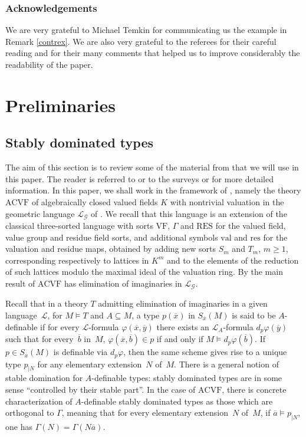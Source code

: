 \documentclass[JEP,XML,SOM,Unicode,ThmDefs,NoEqCountersInSection,published]{cedram}
\newcommand{\val}{\mathrm{val}}
\newcommand{\acvf}{\mathrm{ACVF}}
\newcommand{\RES}{\mathrm{RES}}
\newcommand{\res}{\mathrm{res}}
\newcommand{\VF}{\mathrm{VF}}
\theoremstyle{plain}
\theoremstyle{definition}
\begin{document}
\subsubsection*{Acknowledgements}
We are very grateful to Michael Temkin for communicating us the example in Remark \ref{contrex}.
We are also very grateful to the referees
for their careful reading and for their many comments that helped us to improve considerably the readability of the paper.

\section{Preliminaries}\label{section2}
\subsection{Stably dominated types}The aim of this section is to review some of the material from \cite{HL} that we will use in this paper.
The reader is referred to \cite{HL} or to the surveys \cite{bbk} or \cite{simons} for more detailed information.
In this paper, we shall work in the framework of \cite{HL}, namely the theory $\acvf$ of
algebraically closed valued fields $K$ with nontrivial valuation
in
the geometric language ${\mathcal L}_{\mathcal{G}}$
of
\cite{haskell-h-m2006}. We recall that this language is an extension
of the classical three-sorted language
with sorts $\VF$, $\Gamma$ and $\RES$ for the valued field, value group and residue field sorts,
and additional symbols $\val$ and $\res$ for the valuation and residue maps, obtained by adding new sorts
$S_m$ and $T_m$, $m \geq 1$, corresponding respectively to
lattices in $K^m$ and to the elements of the reduction of such lattices modulo the maximal ideal of the valuation ring.
By the main result of \cite{haskell-h-m2006} $\acvf$ has elimination of imaginaries in ${\mathcal L}_{\mathcal{G}}$.

Recall that in a theory $T$ admitting elimination of imaginaries in a given language~$\mathcal{L}$,
for $M \models T$ and $A \subseteq M$, a type
$p (\overline{x})$ in $S_{\overline{x}} (M)$ is said to be $A$-definable if for
every
$\mathcal{L}$-formula
$\varphi (\overline{x}, \overline{y})$
there exists
an
$\mathcal{L}_A$-formula
$d_p \varphi (\overline{y})$ such that
for every~$\overline{b}$ in~$M$,
$\varphi (\overline{x}, \overline{b}) \in p$ if and only if
$M \models d_p \varphi (\overline{b})$.
If $p \in S_{\overline{x}} (M)$ is definable via $d_p \varphi$, then the same scheme gives rise to a unique
type $p_{\vert N}$ for any elementary extension~$N$ of~$M$.
There is a general notion of stable domination for
$A$-definable types: stably dominated types are in some sense ``controlled by their stable part''.
In the case of $\acvf$, there is concrete characterization of $A$-definable stably dominated types as those which are
orthogonal to $\Gamma$, meaning that for every elementary extension~$N$ of~$M$, if $\overline{a} \models p_{\vert N}$, one has $\Gamma (N) = \Gamma (N \overline{a})$.
\end{document}
